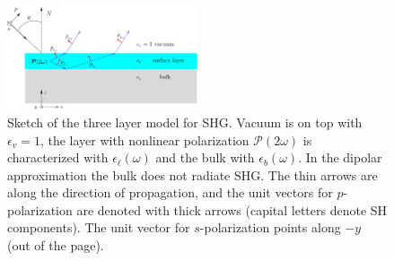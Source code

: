\begin{figure}[t]
\centering
\includegraphics[width=0.5\textwidth]{content/figures/diag-3layer}
\caption{Sketch of the three layer model for SHG. Vacuum is on top with
$\epsilon_v=1$, the layer with nonlinear polarization 
$\boldsymbol{\mathcal{P}}(2\omega)$
is characterized with $\epsilon_{\ell}(\omega)$ and the bulk with
$\epsilon_{b}(\omega)$. In the dipolar approximation the bulk does not radiate
SHG. The thin arrows are along the direction of propagation, and the unit
vectors for $p$-polarization are denoted with thick arrows (capital letters
denote SH components). The unit vector for $s$-polarization points along $-y$
(out of the page).\label{fig:3layer}}
\end{figure}

